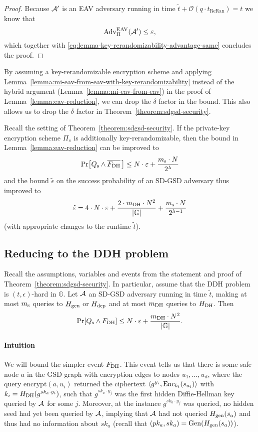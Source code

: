 \begin{proof}
	Because $\mathcal{A}'$ is an EAV adversary running in time $\tilde{t} + \mathcal{O}(q \cdot t_{\mathrm{ReRan}}) = t$ we know that
	\[
		\mathrm{Adv}_{\Pi}^{\mathrm{EAV}}(\mathcal{A}') \le \varepsilon,
	\]
	which together with \eqref{eq:lemma-key-rerandomizability-advantage-same} concludes the proof.
\end{proof}

By assuming a key-rerandomizable encryption scheme and applying Lemma~\vref{lemma:mi-eav-from-eav-with-key-rerandomizability} instead of the hybrid argument (Lemma~\ref{lemma:mi-eav-from-eav}) in the proof of Lemma~\ref{lemma:eav-reduction}, we can drop the $\delta$ factor in the bound. This also allows us to drop the $\delta$ factor in Theorem~\vref{theorem:sdgsd-security}.

\begin{corollary}
	Recall the setting of Theorem~\ref{theorem:sdgsd-security}. If the private-key encryption scheme $\Pi_s$ is additionally key-rerandomizable, then the bound in Lemma~\ref{lemma:eav-reduction} can be improved to
	\[
		\pr{\qs \land \overline{\fdh}\,} \le N \cdot \epsilon + \frac{\ms \cdot N}{2^\lambda}
	\]
	and the bound $\tilde{\epsilon}$ on the success probability of an SD-GSD adversary thus improved to
	\[
		\tilde{\varepsilon} = 4 \cdot N \cdot \varepsilon + \frac{2 \cdot m_\mathrm{DH} \cdot N^2}{\lvert\mathbb{G}\rvert} + \frac{m_\mathrm{s} \cdot N}{2^{\lambda - 1}}
	\]
	(with appropriate changes to the runtime $\tilde{t}$).
\end{corollary}


\subsection{Reducing to the DDH problem}

\begin{lemma} \label{lemma:dh-reduction}
	Recall the assumptions, variables and events from the statement and proof of Theorem~\ref{theorem:sdgsd-security}. In particular, assume that the DDH problem is $(t, \epsilon)$-hard in $\mathbb{G}$. Let $\mathcal{A}$ an SD-GSD adversary running in time $\tilde{t}$, making at most $m_\mathrm{s}$ queries to $H_\mathrm{gen}$ or $H_\mathrm{dep}$ and at most $m_\mathrm{DH}$ queries to $H_\mathrm{DH}$. Then
	\[
		\pr{\qs \land \fdh} \le N \cdot \epsilon + \frac{\mdh \cdot N^2}{\abs{\mathbb{G}}}.
	\]
\end{lemma}

\paragraph{Intuition} We will bound the simpler event $F_\mathrm{DH}$. This event tells us that there is some safe node $a$ in the GSD graph with encryption edges to nodes $u_1, \ldots, u_d$, where the query $\mathrm{encrypt}(a, u_i)$ returned the ciphertext $\langle g^{y_i}, \mathrm{Enc}_{k_i}(s_{u_i}) \rangle$ with $k_i = H_\mathrm{DH}(g^{sk_{a} \cdot y_i})$, such that $g^{sk_a \cdot y_j}$ was the first hidden Diffie-Hellman key queried by $\mathcal{A}$ for some $j$.
Moreover, at the instance $g^{sk_a \cdot y_j}$ was queried, no hidden seed had yet been queried by $\mathcal{A}$, implying that $\mathcal{A}$ had not queried $H_\mathrm{gen}(s_a)$ and thus had no information about $sk_a$ (recall that $(pk_a, sk_a) = \mathrm{Gen}(H_\mathrm{gen}(s_a))$).


